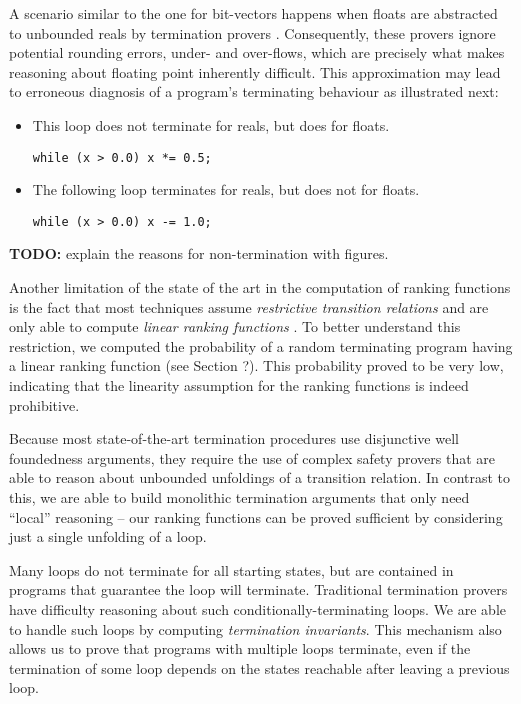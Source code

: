 \documentclass[preprint]{sigplanconf}
\theoremstyle{definition}
\newcommand{\todo}[1]{{\bf TODO:} #1}
\begin{document}
A scenario similar to the one for bit-vectors happens when floats are abstracted to unbounded reals by termination provers \cite{}.
Consequently, these provers ignore potential rounding errors, under- and over-flows, which are precisely what makes  reasoning about floating point inherently difficult.
This approximation may lead to erroneous diagnosis of a program's terminating behaviour as illustrated next:
\begin{itemize}
\item This loop does not terminate for reals, but does for floats.
\begin{lstlisting}
while (x > 0.0) x *= 0.5;
\end{lstlisting}

\item The following loop terminates for reals, but does not for floats.
\begin{lstlisting}
while (x > 0.0) x -= 1.0;
\end{lstlisting}
\end{itemize}   
\todo{explain the reasons for non-termination with figures.}


Another limitation of the state of the art in the computation of ranking functions is the fact that  most techniques assume \emph{restrictive transition relations} and are only able to compute
\emph{linear ranking functions} \cite{}. To better understand this restriction, we computed the probability of a random terminating program having a linear ranking
function (see Section ?). This probability proved to be very low, indicating that the linearity assumption for the ranking functions is indeed prohibitive.

Because most state-of-the-art termination procedures use disjunctive well foundedness arguments, they require the use of
complex safety provers that are able to reason about unbounded unfoldings of a transition relation.  In contrast to this,
we are able to build monolithic termination arguments that only need ``local'' reasoning -- our ranking functions
can be proved sufficient by considering just a single unfolding of a loop.

Many loops do not terminate for all starting states, but are contained in programs that guarantee the loop will
terminate.  Traditional termination provers have difficulty reasoning about such conditionally-terminating loops.
We are able to handle such loops by computing \emph{termination invariants}.  This mechanism also allows us to
prove that programs with multiple loops terminate, even if the termination of some loop depends on the states
reachable after leaving a previous loop.
\end{document}
